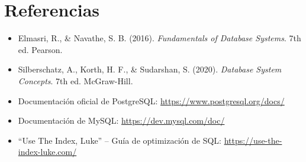 \documentclass[12pt,a4paper,openany,oneside]{book}
\begin{document}
\chapter*{Referencias}
\begin{itemize}
    \item Elmasri, R., \& Navathe, S. B. (2016). \textit{Fundamentals of Database Systems}. 7th ed. Pearson.
    \item Silberschatz, A., Korth, H. F., \& Sudarshan, S. (2020). \textit{Database System Concepts}. 7th ed. McGraw-Hill.
    \item Documentación oficial de PostgreSQL: \url{https://www.postgresql.org/docs/}
    \item Documentación de MySQL: \url{https://dev.mysql.com/doc/}
    \item ``Use The Index, Luke'' – Guía de optimización de SQL: \url{https://use-the-index-luke.com/}
\end{itemize}
\end{document}
